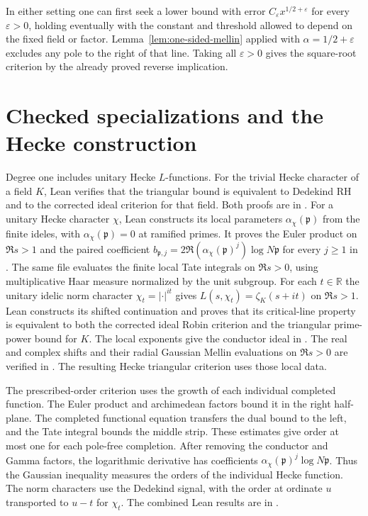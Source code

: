 \documentclass[11pt]{amsart}
\theoremstyle{definition}
\theoremstyle{remark}
\numberwithin{equation}{section}
\begin{document}
In either setting one can first seek a lower bound with error
\(C_\varepsilon x^{1/2+\varepsilon}\) for every \(\varepsilon>0\),
holding eventually with the constant and threshold allowed to
depend on the fixed field or factor. Lemma~\ref{lem:one-sided-mellin}
applied with \(\alpha=1/2+\varepsilon\) excludes any pole to the
right of that line. Taking all \(\varepsilon>0\) gives the
square-root criterion by the already proved reverse implication.

\section{Checked specializations and the Hecke construction}
\label{app:hecke-formalization}

Degree one includes unitary Hecke $L$-functions. For the trivial
Hecke character of a field $K$, Lean verifies that the triangular
bound is equivalent to Dedekind RH and to the corrected ideal
criterion for that field. Both proofs are in
.
For a unitary Hecke character $\chi$, Lean constructs its local
parameters $\alpha_\chi(\mathfrak p)$ from the finite ideles, with
$\alpha_\chi(\mathfrak p)=0$ at ramified primes. It proves the Euler
product on $\Re s>1$ and the paired coefficient
$b_{\mathfrak p,j}=2\Re(\alpha_\chi(\mathfrak p)^j)\log N\mathfrak p$
for every $j\ge1$ in .
The same file evaluates the finite local Tate integrals on $\Re s>0$,
using multiplicative Haar measure normalized by the unit subgroup.
For each $t\in\mathbb R$ the unitary idelic norm character
$\chi_t=|\cdot|^{it}$ gives $L(s,\chi_t)=\zeta_K(s+it)$ on $\Re s>1$.
Lean constructs its shifted continuation and proves that its critical-line
property is equivalent to both the corrected ideal Robin criterion and the
triangular prime-power bound for $K$.
The local exponents give the conductor ideal in
. The real and complex
shifts and their radial Gaussian Mellin evaluations on $\Re s>0$
are verified in .
The resulting Hecke triangular criterion uses those local data.

The prescribed-order criterion uses the growth of each individual
completed function.
The Euler product and archimedean factors bound it in the right
half-plane. The completed functional equation transfers the dual
bound to the left, and the Tate integral bounds the middle strip.
These estimates give order at most one for each pole-free completion.
After removing the conductor and Gamma factors, the logarithmic
derivative has coefficients
\(\alpha_\chi(\mathfrak p)^j\log N\mathfrak p\).
Thus the Gaussian inequality measures the orders of the individual
Hecke function. The norm characters use the Dedekind signal,
with the order at ordinate \(u\) transported to \(u-t\) for
\(\chi_t\). The combined Lean results are in
.
\end{document}
